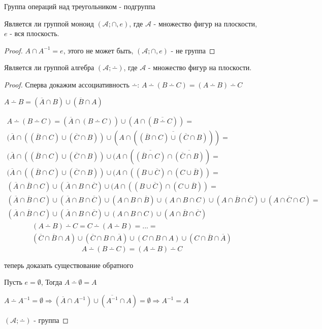 \documentclass[../main/document.tex]{subfiles}
\begin{document}
\begin{exm}
Группа операций над треугольником - подгруппа
\end{exm}
\begin{exm}
Является ли группой моноид $(\mathcal{A};\cap,e)$, где $\mathcal{A}$ - множество фигур на плоскости, $e$ - вся плоскость.
\begin{proof}
$A\cap A^{-1}=e$, этого не может быть, $(\mathcal{A};\cap,e)$ - не группа
\end{proof}
Является ли группой алгебра $(\mathcal{A};\dotminus)$, где $\mathcal{A}$ - множество фигур на плоскости.
\begin{proof}
Сперва докажим ассоциативность $\dotminus$: $A\dotminus (B\dotminus C)=(A\dotminus B)\dotminus C$

$A\dotminus B=(\overline{A}\cap B)\cup(\overline{B}\cap A)$

\begin{multline*}
A\dotminus (B\dotminus C)=(\overline{A}\cap (B\dotminus C))\cup(A\cap (\overline{B\dotminus C}))=\\
(\overline{A}\cap ((\overline{B}\cap C)\cup(\overline{C}\cap B))\cup(A\cap (\overline{(\overline{B}\cap C)\cup(\overline{C}\cap B)}))=\\
(\overline{A}\cap ((\overline{B}\cap C)\cup(\overline{C}\cap B))\cup(A\cap
(\overline{(\overline{B}\cap C)}\cap \overline{(\overline{C}\cap B)})=\\
(\overline{A}\cap ((\overline{B}\cap C)\cup(\overline{C}\cap B))\cup(A\cap
((B\cup \overline{C})\cap (C\cup \overline{B}))=\\
(\overline{A}\cap \overline{B}\cap C)\cup (\overline{A}\cap B\cap \overline{C})
\cup(A\cap
((B\cup \overline{C})\cap (C\cup \overline{B}))=\\
(\overline{A}\cap \overline{B}\cap C)\cup (\overline{A}\cap B\cap \overline{C})
\cup
(A\cap B\cap \overline{B})\cup (A\cap B\cap C)\cup (A\cap \overline{B}\cap \overline{C})\cup (A\cap \overline{C}\cap C)=\\
(\overline{A}\cap \overline{B}\cap C)\cup (\overline{A}\cap B\cap \overline{C})
\cup
(A\cap B\cap C)\cup (A\cap \overline{B}\cap \overline{C})
\end{multline*}
\begin{multline*}
(A\dotminus B)\dotminus C=C\dotminus (A\dotminus B)=...=\\
(\overline{C}\cap \overline{B}\cap A)\cup (\overline{C}\cap B\cap \overline{A})
\cup
(C\cap B\cap A)\cup (C\cap \overline{B}\cap \overline{A})
\end{multline*}
$$A\dotminus (B\dotminus C)=(A\dotminus B)\dotminus C$$

теперь доказать существование обратного

Пусть $e=\emptyset$, Тогда $A\dotminus \emptyset=A$

$A\dotminus A^{-1}=\emptyset\Rightarrow (\overline{A}\cap A^{-1})\cup (\overline{A^{-1}}\cap A)=\emptyset\Rightarrow A^{-1}=A$

$(\mathcal{A};\dotminus)$ - группа
\end{proof}
\end{exm}
\end{document}
